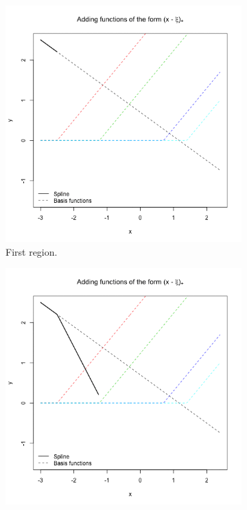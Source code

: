 \documentclass[12pt, letterpaper]{article}
\theoremstyle{definition}
\begin{document}
\begin{figure}
\begin{subfigure}{0.49\textwidth}
\centering
\includegraphics[width=0.9\linewidth]{img/spline_linear/10}
\caption{First region.}
\end{subfigure}
\hfill
\begin{subfigure}{0.49\textwidth}
\centering
\includegraphics[width=0.9\linewidth]{img/spline_linear/33}

\end{subfigure}
\end{figure}
\end{document}
